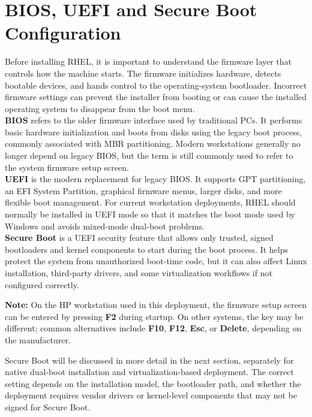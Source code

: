 \section{BIOS, UEFI and Secure Boot Configuration}

Before installing RHEL, it is important to understand the firmware layer that controls how the
machine starts. The firmware initializes hardware, detects bootable devices, and hands control
to the operating-system bootloader. Incorrect firmware settings can prevent the installer from
booting or can cause the installed operating system to disappear from the boot menu.\\

\textbf{BIOS} refers to the older firmware interface used by traditional PCs. It performs basic
hardware initialization and boots from disks using the legacy boot process, commonly associated
with MBR partitioning. Modern workstations generally no longer depend on legacy BIOS, but the
term is still commonly used to refer to the system firmware setup screen.\\

\textbf{UEFI} is the modern replacement for legacy BIOS. It supports GPT partitioning, an EFI
System Partition, graphical firmware menus, larger disks, and more flexible boot management.
For current workstation deployments, RHEL should normally be installed in UEFI mode so that it
matches the boot mode used by Windows and avoids mixed-mode dual-boot problems.\\

\textbf{Secure Boot} is a UEFI security feature that allows only trusted, signed bootloaders and
kernel components to start during the boot process. It helps protect the system from unauthorized
boot-time code, but it can also affect Linux installation, third-party drivers, and some
virtualization workflows if not configured correctly.\\

\begin{tcolorbox}
	\noindent \textbf{Note:} On the HP workstation used in this deployment, the firmware setup
	screen can be entered by pressing \textbf{F2} during startup. On other systems, the key may
	be different; common alternatives include \textbf{F10}, \textbf{F12}, \textbf{Esc}, or
	\textbf{Delete}, depending on the manufacturer.
\end{tcolorbox}

Secure Boot will be discussed in more detail in the next section, separately for native
dual-boot installation and virtualization-based deployment. The correct setting depends on the
installation model, the bootloader path, and whether the deployment requires vendor drivers or
kernel-level components that may not be signed for Secure Boot.\\

